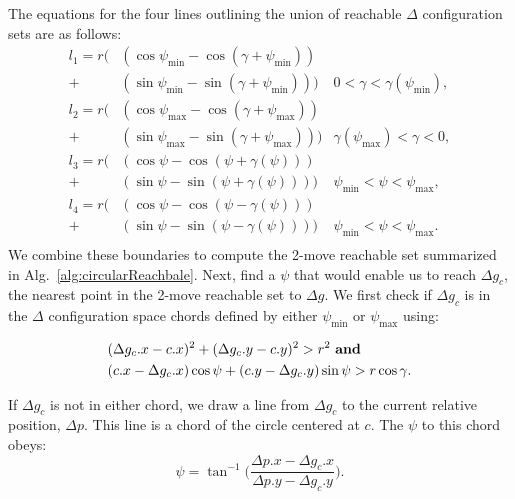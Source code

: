 The equations for the four lines outlining the union of reachable $\Delta$ configuration sets are as follows:
\begin{align}\label{eq:circlereachable}
l_1 =  r \Big(&(\cos\psi_{\min}- \cos(\gamma + \psi_{\min}) )\\ \nonumber
 + &(\sin\psi_{\min}- \sin(\gamma + \psi_{\min}))\Big) &  0<\gamma< \gamma(\psi_{\min}),\\ \nonumber
l_2 =  r \Big(&(\cos\psi_{\max}- \cos(\gamma + \psi_{\max}))\\ \nonumber
 + &(\sin\psi_{\max}- \sin(\gamma + \psi_{\max}))\Big) &  \gamma(\psi_{\max})<\gamma< 0,\\  \nonumber
l_3 =  r \Big(&(\cos\psi- \cos( \psi+\gamma(\psi) ) )\\ \nonumber
+ &( \sin\psi-\sin( \psi+ \gamma(\psi)))\Big) &  \psi_{\min}<\psi< \psi_{\max},\\ \nonumber
l_4 =  r \Big(&(\cos\psi- \cos( \psi-\gamma(\psi) ))\\ \nonumber
+ & ( \sin\psi- \sin( \psi- \gamma(\psi)))\Big) &  \psi_{\min}<\psi< \psi_{\max}.\\ \nonumber
\end{align}
We combine these boundaries to compute the 2-move reachable set summarized in Alg.~\ref{alg:circularReachbale}.
Next, find a $\psi$ that would enable us to reach $\Delta g_c$, the nearest point in the 2-move reachable set to $\Delta g$. %
We first check if $\Delta g_c$ is in the $\Delta$ configuration space chords defined by either $\psi_{\min}$ or $\psi_{\max}$ using: 

\begin{align}\label{eq:ifinchord}
&(\Delta g_c.x - c.x)^2 + (\Delta g_c.y - c.y)^2  > r^2 \textrm{     \textbf{and}}\\ \nonumber
 &( c.x-\Delta g_c.x ) \cos\psi + ( c.y-\Delta g_c.y) \sin\psi > r\cos\gamma.
\end{align}

 If $\Delta g_c$ is not in either chord, we draw a line from $\Delta g_c$ to the current relative position, $\Delta p$. This line is a chord of the circle centered at $c$. The $\psi$ to this chord obeys:
  \begin{equation}
 \psi = \tan^{-1}\Big(\frac{\Delta p.x - \Delta g_c.x}{\Delta p.y - \Delta g_c.y} \Big).
 \end{equation}
 
